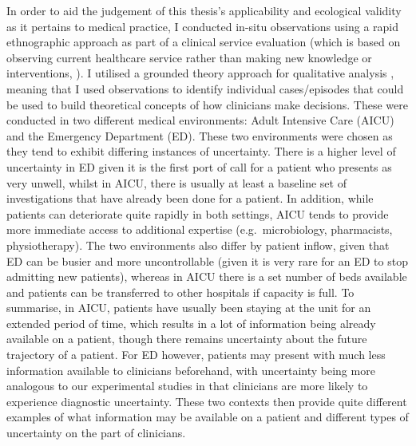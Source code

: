 \documentclass[a4paper, nobind]{templates/ociamthesis}
\begin{document}
\hfill\break
In order to aid the judgement of this thesis's applicability and ecological validity as it pertains to medical practice, I conducted in-situ observations using a rapid ethnographic approach \autocite{vindrola-padros_quick_2018} as part of a clinical service evaluation (which is based on observing current healthcare service rather than making new knowledge or interventions, \textcite{twycross_service_2014}). I utilised a grounded theory approach for qualitative analysis \autocite{smith1995}, meaning that I used observations to identify individual cases/episodes that could be used to build theoretical concepts of how clinicians make decisions. These were conducted in two different medical environments: Adult Intensive Care (AICU) and the Emergency Department (ED). These two environments were chosen as they tend to exhibit differing instances of uncertainty. There is a higher level of uncertainty in ED given it is the first port of call for a patient who presents as very unwell, whilst in AICU, there is usually at least a baseline set of investigations that have already been done for a patient. In addition, while patients can deteriorate quite rapidly in both settings, AICU tends to provide more immediate access to additional expertise (e.g.~microbiology, pharmacists, physiotherapy). The two environments also differ by patient inflow, given that ED can be busier and more uncontrollable (given it is very rare for an ED to stop admitting new patients), whereas in AICU there is a set number of beds available and patients can be transferred to other hospitals if capacity is full. To summarise, in AICU, patients have usually been staying at the unit for an extended period of time, which results in a lot of information being already available on a patient, though there remains uncertainty about the future trajectory of a patient. For ED however, patients may present with much less information available to clinicians beforehand, with uncertainty being more analogous to our experimental studies in that clinicians are more likely to experience diagnostic uncertainty. These two contexts then provide quite different examples of what information may be available on a patient and different types of uncertainty on the part of clinicians.
\end{document}
